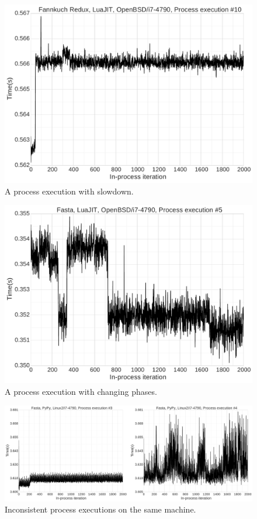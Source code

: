 \documentclass[preprint]{sigplanconf}
\begin{document}
\begin{figure}
\includegraphics[width=.5\textwidth]{examples_v2_results/bad_slowdown.pdf}
\caption{A process execution with slowdown.}
\label{fig:slowdown}
\end{figure}

\begin{figure}
\includegraphics[width=.5\textwidth]{examples_v2_results/bad_phases.pdf}
\caption{A process execution with changing phases.}
\label{fig:phases}
\end{figure}

\begin{figure}
\includegraphics[width=\textwidth]{examples_v2_results/bad_inconsistent.pdf}
\caption{Inconsistent process executions on the same machine.}
\label{fig:inconsistent}
\end{figure}
\end{document}
